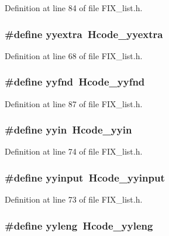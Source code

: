 Definition at line 84 of file FIX\_\-list.h.
\subsubsection{\setlength{\rightskip}{0pt plus 5cm}\#define \bf{yyextra}~Hcode\_\-yyextra}\label{FIX__list_8h_6d98927535a334881d37873915fbc45f}




Definition at line 68 of file FIX\_\-list.h.
\subsubsection{\setlength{\rightskip}{0pt plus 5cm}\#define \bf{yyfnd}~Hcode\_\-yyfnd}\label{FIX__list_8h_b0445c91d9f097f6ae69d625ea5fb4eb}




Definition at line 87 of file FIX\_\-list.h.
\subsubsection{\setlength{\rightskip}{0pt plus 5cm}\#define \bf{yyin}~Hcode\_\-yyin}\label{FIX__list_8h_a789f4617e33fb99594cb04a3688a0c1}




Definition at line 74 of file FIX\_\-list.h.
\subsubsection{\setlength{\rightskip}{0pt plus 5cm}\#define yyinput~Hcode\_\-yyinput}\label{FIX__list_8h_346b83839385380c9d9134ed1cf137bc}




Definition at line 73 of file FIX\_\-list.h.
\subsubsection{\setlength{\rightskip}{0pt plus 5cm}\#define \bf{yyleng}~Hcode\_\-yyleng}\label{FIX__list_8h_fa07a629486cb790560bb95713ec7794}




